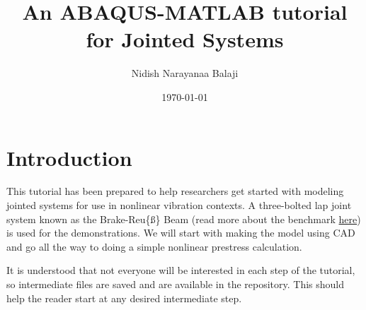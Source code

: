 \documentclass[11pt]{article}
\author{Nidish Narayanaa Balaji}
\date{\today}
\title{An ABAQUS-MATLAB tutorial for Jointed Systems}
\begin{document}
\maketitle
\tableofcontents

\pagebreak

\section{Introduction}
\label{sec:orgb8e3cb5}
This tutorial has been prepared to help researchers get started with modeling jointed systems for use in nonlinear vibration contexts.
A three-bolted lap joint system known as the Brake-Reu\{\ss\} Beam (read more about the benchmark \href{https://jointmechanics.org/index.php/Benchmarks\#The\_Brake-Reu\%C3\%9F\_Beams}{here}) is used for the demonstrations.
We will start with making the model using CAD and go all the way to doing a simple nonlinear prestress calculation.

It is understood that not everyone will be interested in each step of the tutorial, so intermediate files are saved and are available in the repository.
This should help the reader start at any desired intermediate step.
\end{document}
